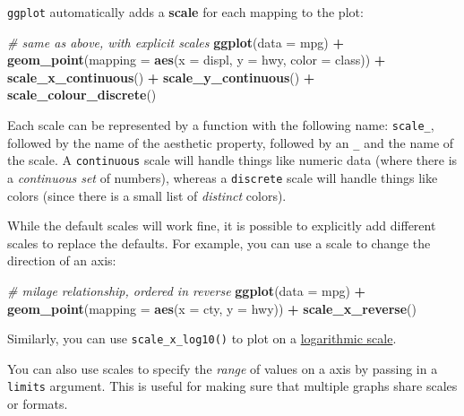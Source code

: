 \documentclass[]{book}
\newenvironment{Shaded}{\begin{snugshade}}{\end{snugshade}}
\newcommand{\KeywordTok}[1]{\textcolor[rgb]{0.13,0.29,0.53}{\textbf{#1}}}
\newcommand{\DataTypeTok}[1]{\textcolor[rgb]{0.13,0.29,0.53}{#1}}
\newcommand{\StringTok}[1]{\textcolor[rgb]{0.31,0.60,0.02}{#1}}
\newcommand{\CommentTok}[1]{\textcolor[rgb]{0.56,0.35,0.01}{\textit{#1}}}
\newcommand{\OperatorTok}[1]{\textcolor[rgb]{0.81,0.36,0.00}{\textbf{#1}}}
\newcommand{\NormalTok}[1]{#1}
\theoremstyle{definition}
\theoremstyle{definition}
\theoremstyle{remark}
\begin{document}
\texttt{ggplot} automatically adds a \textbf{scale} for each mapping to
the plot:

\begin{Shaded}
\begin{Highlighting}[]
\CommentTok{# same as above, with explicit scales}
\KeywordTok{ggplot}\NormalTok{(}\DataTypeTok{data =}\NormalTok{ mpg) }\OperatorTok{+}
\StringTok{  }\KeywordTok{geom_point}\NormalTok{(}\DataTypeTok{mapping =} \KeywordTok{aes}\NormalTok{(}\DataTypeTok{x =}\NormalTok{ displ, }\DataTypeTok{y =}\NormalTok{ hwy, }\DataTypeTok{color =}\NormalTok{ class)) }\OperatorTok{+}
\StringTok{  }\KeywordTok{scale_x_continuous}\NormalTok{() }\OperatorTok{+}
\StringTok{  }\KeywordTok{scale_y_continuous}\NormalTok{() }\OperatorTok{+}
\StringTok{  }\KeywordTok{scale_colour_discrete}\NormalTok{()}
\end{Highlighting}
\end{Shaded}

Each scale can be represented by a function with the following name:
\texttt{scale\_}, followed by the name of the aesthetic property,
followed by an \texttt{\_} and the name of the scale. A
\texttt{continuous} scale will handle things like numeric data (where
there is a \emph{continuous set} of numbers), whereas a
\texttt{discrete} scale will handle things like colors (since there is a
small list of \emph{distinct} colors).

While the default scales will work fine, it is possible to explicitly
add different scales to replace the defaults. For example, you can use a
scale to change the direction of an axis:

\begin{Shaded}
\begin{Highlighting}[]
\CommentTok{# milage relationship, ordered in reverse}
\KeywordTok{ggplot}\NormalTok{(}\DataTypeTok{data =}\NormalTok{ mpg) }\OperatorTok{+}
\StringTok{  }\KeywordTok{geom_point}\NormalTok{(}\DataTypeTok{mapping =} \KeywordTok{aes}\NormalTok{(}\DataTypeTok{x =}\NormalTok{ cty, }\DataTypeTok{y =}\NormalTok{ hwy)) }\OperatorTok{+}
\StringTok{  }\KeywordTok{scale_x_reverse}\NormalTok{()}
\end{Highlighting}
\end{Shaded}

Similarly, you can use \texttt{scale\_x\_log10()} to plot on a
\href{https://en.wikipedia.org/wiki/Logarithmic_scale}{logarithmic
scale}.

You can also use scales to specify the \emph{range} of values on a axis
by passing in a \texttt{limits} argument. This is useful for making sure
that multiple graphs share scales or formats.
\end{document}
